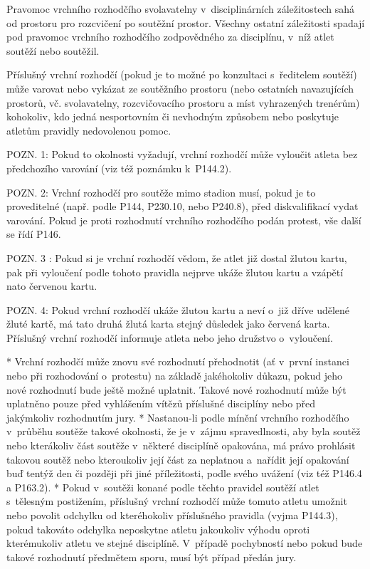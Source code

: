Pravomoc vrchního rozhodčího svolavatelny v~disciplinárních záležitostech sahá od prostoru pro rozcvičení po soutěžní prostor. Všechny ostatní záležitosti spadají pod pravomoc vrchního rozhodčího zodpovědného za disciplínu, v~níž atlet soutěží nebo soutěžil.

Příslušný vrchní rozhodčí (pokud je to možné po konzultaci s~ředitelem soutěží) může varovat nebo vykázat ze soutěžního prostoru (nebo ostatních navazujících prostorů, vč. svolavatelny, rozcvičovacího prostoru a míst vyhrazených trenérům) kohokoliv, kdo jedná nesportovním či nevhodným způsobem nebo poskytuje atletům pravidly nedovolenou pomoc.

POZN. 1: Pokud to okolnosti vyžadují, vrchní rozhodčí může vyloučit atleta bez předchozího varování (viz též poznámku k~P144.2).

POZN. 2: Vrchní rozhodčí pro soutěže mimo stadion musí, pokud je to proveditelné (např. podle P144, P230.10, nebo P240.8), před diskvalifikací vydat varování. Pokud je proti rozhodnutí vrchního rozhodčího podán protest, vše další se řídí P146.

POZN. 3 : Pokud si je vrchní rozhodčí vědom, že atlet již dostal žlutou kartu, pak při vyloučení podle tohoto pravidla nejprve ukáže žlutou kartu a vzápětí nato červenou kartu.

POZN. 4: Pokud vrchní rozhodčí ukáže žlutou kartu a neví o~již dříve udělené žluté kartě, má tato druhá žlutá karta stejný důsledek jako červená karta. Příslušný vrchní rozhodčí informuje atleta nebo jeho družstvo o~vyloučení.

* Vrchní rozhodčí může znovu své rozhodnutí přehodnotit (ať v~první instanci nebo při rozhodování o~protestu) na základě jakéhokoliv důkazu, pokud jeho nové rozhodnutí bude ještě možné uplatnit. Takové nové rozhodnutí může být uplatněno pouze před vyhlášením vítězů příslušné disciplíny nebo před jakýmkoliv rozhodnutím jury.
* Nastanou-li podle mínění vrchního rozhodčího v~průběhu soutěže takové okolnosti, že je v~zájmu spravedlnosti, aby byla soutěž nebo kterákoliv část soutěže v~některé disciplíně opakována, má právo prohlásit takovou soutěž nebo kteroukoliv její část za neplatnou a~nařídit její opakování buď tentýž den či později při jiné příležitosti, podle svého uvážení (viz též P146.4 a P163.2).
* Pokud v~soutěži konané podle těchto pravidel soutěží atlet s~tělesným postižením, příslušný vrchní rozhodčí může tomuto atletu umožnit nebo povolit odchylku od kteréhokoliv příslušného pravidla (vyjma P144.3), pokud takováto odchylka neposkytne atletu jakoukoliv výhodu oproti kterémukoliv atletu ve stejné disciplíně. V~případě pochybností nebo pokud bude takové rozhodnutí předmětem sporu, musí být případ předán jury.

